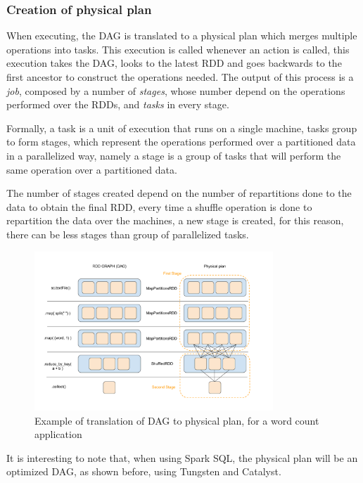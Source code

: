 \documentclass[11pt]{book} %
\begin{document}
        \subsubsection{Creation of physical plan}

          When executing, the DAG is translated to a physical plan which merges multiple operations into tasks. This execution is called whenever an action is called, this execution takes the DAG, looks to the latest RDD and goes backwards to the first ancestor to construct the operations needed. The output of this process is a \emph{job}, composed by a number of \emph{stages}, whose number depend on the operations performed over the RDDs, and \emph{tasks} in every stage.

          Formally, a task is a unit of execution that runs on a single machine, tasks group to form stages, which represent the operations performed over a partitioned data in a parallelized way, namely a stage is a group of tasks that will perform the same operation over a partitioned data.

          The number of stages created depend on the number of repartitions done to the data to obtain the final RDD, every time a shuffle operation is done to repartition the data over the machines, a new stage is created, for this reason, there can be less stages than group of parallelized tasks.

          \begin{figure}[!ht]
            \centering
            \includegraphics[width=0.8\textwidth]{DAG_to_phisical_plan.png}
            \caption{Example of translation of DAG to physical plan, for a word count application}
            \label{img:DAG_to_physical}
          \end{figure}

          It is interesting to note that, when using Spark SQL, the physical plan will be an optimized DAG, as shown before, using Tungsten and Catalyst.
\end{document}
